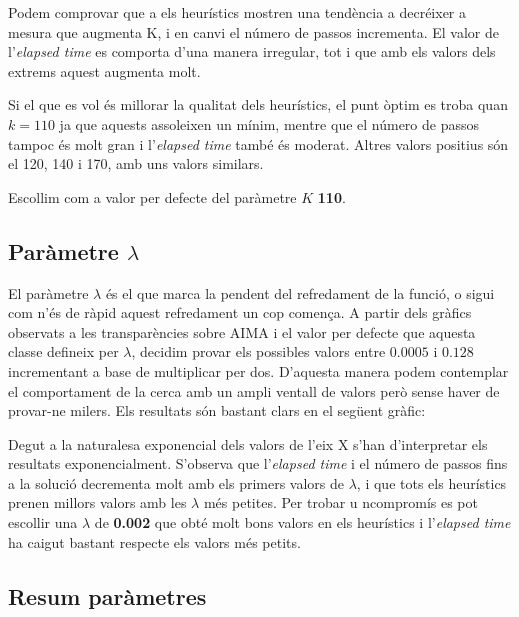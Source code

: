 
Podem comprovar que a els heurístics mostren una tendència a decréixer a mesura que augmenta K, i en canvi el número de passos incrementa. El valor de l'\emph{elapsed time} es comporta d'una manera irregular, tot i que amb els valors dels extrems aquest augmenta molt.

Si el que es vol és millorar la qualitat dels heurístics, el punt òptim es troba quan $k = 110$ ja que aquests assoleixen un mínim, mentre que el número de passos tampoc és molt gran i l'\emph{elapsed time} també és moderat. Altres valors positius són el 120, 140 i 170, amb uns valors similars.

Escollim com a valor per defecte del paràmetre $K$ \textbf{110}.


\newpage
\subsection{Paràmetre $\lambda$} %
\label{sub:parametre_lambda}

El paràmetre $\lambda$ és el que marca la pendent del refredament de la funció, o sigui com n'és de ràpid aquest refredament un cop comença. A partir dels gràfics observats a les transparències sobre AIMA i el valor per defecte que aquesta classe defineix per $\lambda$, decidim provar els possibles valors entre $0.0005$ i $0.128$ incrementant a base de multiplicar per dos. D'aquesta manera podem contemplar el comportament de la cerca amb un ampli ventall de valors però sense haver de provar-ne milers. Els resultats són bastant clars en el següent gràfic:


Degut a la naturalesa exponencial dels valors de l'eix X s'han d'interpretar els resultats exponencialment. S'observa que l'\emph{elapsed time} i el número de passos fins a la solució decrementa molt amb els primers valors de $\lambda$, i que tots els heurístics prenen millors valors amb les $\lambda$ més petites. Per trobar u ncompromís es pot escollir una $\lambda$ de \textbf{0.002} que obté molt bons valors en els heurístics i l'\emph{elapsed time} ha caigut bastant respecte els valors més petits.

\subsection{Resum paràmetres} %
\label{sub:resum_parametres}

